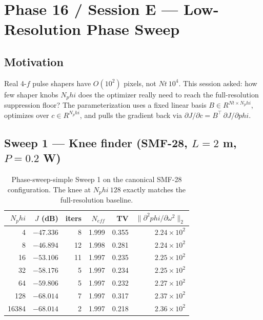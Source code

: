 \documentclass[11pt,letterpaper]{article}
\def\varphi{phi}%
\def\mathrm#1{#1}%
\def\approx{~}%
\def\mathcal#1{#1}%
\def\mathbb#1{#1}%
\begin{document}
\newpage
\section{Phase 16 / Session E --- Low-Resolution Phase Sweep}
\label{sec:sessionE}

\subsection{Motivation}

Real 4-$f$ pulse shapers have $\mathcal{O}(10^2)$ pixels, not $\mathrm{Nt} \approx 10^4$. This session asked: how few shaper knobs $\mathrm{N}_\varphi$ does the optimizer really need to reach the full-resolution suppression floor? The parameterization uses a fixed linear basis $B \in \mathbb{R}^{\mathrm{Nt} \times \mathrm{N}_\varphi}$, optimizes over $c \in \mathbb{R}^{\mathrm{N}_\varphi}$, and pulls the gradient back via $\partial J / \partial c = B^\top \, \partial J / \partial \varphi$.

\subsection{Sweep 1 --- Knee finder (SMF-28, $L=2$ m, $P=0.2$ W)}

\begin{table}[H]
\centering
\small
\begin{tabular}{rrrrrr}
\toprule
$\mathrm{N}_\varphi$ & $J$ (dB) & iters & $\mathrm{N}_{\mathrm{eff}}$ & TV & $\|\partial^2\varphi/\partial\omega^2\|_2$ \\
\midrule
     4 & $-47.336$ &  8 & 1.999 & 0.355 & $2.24 \times 10^{2}$ \\
     8 & $-46.894$ & 12 & 1.998 & 0.281 & $2.24 \times 10^{2}$ \\
    16 & $-53.106$ & 11 & 1.997 & 0.235 & $2.25 \times 10^{2}$ \\
    32 & $-58.176$ &  5 & 1.997 & 0.234 & $2.25 \times 10^{2}$ \\
    64 & $-59.806$ &  5 & 1.997 & 0.232 & $2.27 \times 10^{2}$ \\
   128 & $-68.014$ &  7 & 1.997 & 0.317 & $2.37 \times 10^{2}$ \\
 16384 & $-68.014$ &  2 & 1.997 & 0.218 & $2.36 \times 10^{2}$ \\
\bottomrule
\end{tabular}
\caption{Phase-sweep-simple Sweep 1 on the canonical SMF-28 configuration. The knee at $\mathrm{N}_\varphi \approx 128$ exactly matches the full-resolution baseline.}
\end{table}
\end{document}
